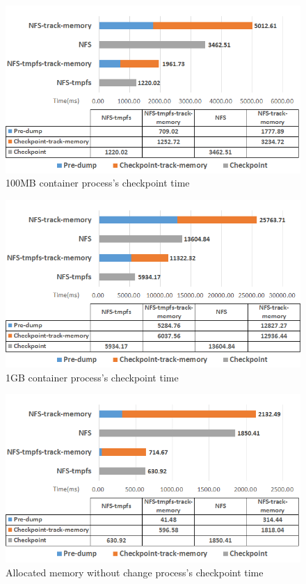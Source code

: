 \begin{figure}[htbp]
\begin{center}
\includegraphics[width=14cm]{figure/100MB.png}
\end{center}
\caption{100MB container process's checkpoint time}
\label{fig:100MB}
\end{figure}

\begin{figure}[htbp]
\begin{center}
\includegraphics[width=14cm]{figure/1GB.png}
\end{center}
\caption{1GB container process's checkpoint time}
\label{fig:1GB}
\end{figure}

\begin{figure}[htbp]
\begin{center}
\includegraphics[width=14cm]{figure/allocate_mem_without_change.png}
\end{center}
\caption{Allocated memory without change process's checkpoint time}
\label{fig:allocate memory}
\end{figure}

